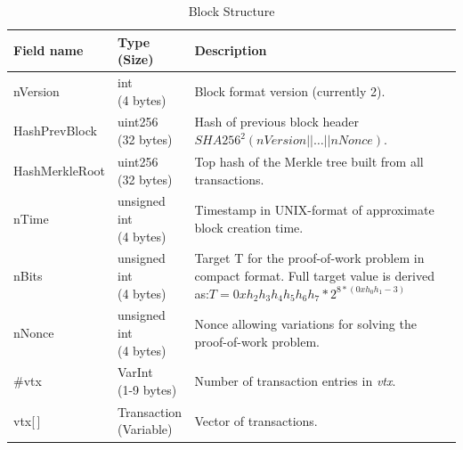 \begin{table}[ht!]
	\begin{tabularx}{\textwidth}{ | m{70pt} | >{\centering} m{60pt} | X |}

		\hline
		\textbf{Field name} &
		\bigcell{c}{\textbf{Type} \\ \textbf{(Size)}} &
		\textbf{Description}\\ \hline\hline
    
		nVersion &
		\bigcell{c}{int \\ (4 bytes)} &
		Block format version (currently 2). \\ \hline
		
		HashPrevBlock &
		\bigcell{c}{uint256 \\ (32 bytes)} &
		Hash of previous block header \newline
		$SHA256^{2}(nVersion || \dots || nNonce)$. \\ \hline
	
		HashMerkleRoot &
		\bigcell{c}{uint256 \\ (32 bytes)} &
		Top hash of the Merkle tree built from all transactions. \\ \hline
		
		nTime &
		\bigcell{c}{unsigned int \\ (4 bytes)} &
		Timestamp in UNIX-format of approximate block creation time. \\ \hline
	
		nBits &
		\bigcell{c}{unsigned int \\ (4 bytes)} &
		Target T for the proof-of-work problem in compact format. Full target value is derived as:\newline$T = 0xh_{2}h_{3}h_{4}h_{5}h_{6}h_{7} * 2^{8*(0xh_{0}h_{1} - 3)}$\\ \hline
	
		nNonce &
		\bigcell{c}{unsigned int \\ (4 bytes)} &
		Nonce allowing variations for solving the proof-of-work problem.\\ \hline
	
		\#vtx &
		\bigcell{c}{VarInt \\ (1-9 bytes)} &
		Number of transaction entries in \textit{vtx}. \\ \hline
	
		vtx[\,] &
		\bigcell{c}{Transaction \\ (Variable)} &
		Vector of transactions. \\ \hline
	\end{tabularx}
	\vspace{5pt}
	\caption{Block Structure}
	\label{table:CBlock}
\end{table}

